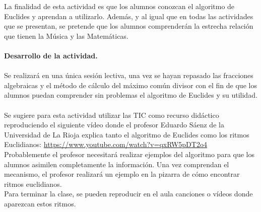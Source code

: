 \documentclass[a4paper, openright, 11pt, titlepage]{report}
\theoremstyle{definition}\newtheorem{defin}[propo]{Definition}
\theoremstyle{definition}\newtheorem{obser}[propo]{Remark}
\theoremstyle{definition}\newtheorem{ejem}[propo]{Ejemplo}
\theoremstyle{definition}\newtheorem{algoritmo}[propo]{Algoritmo}
\begin{document}
\begin{itemize}
    La finalidad de esta actividad es que los alumnos conozcan el algoritmo de Euclides y aprendan a utilizarlo. Además, y al igual que en todas las actividades que se presentan, se pretende que los alumnos comprenderán la estrecha relación que tienen la Música y las Matemáticas.\\\\
    \textbf{Desarrollo de la actividad.}\\\\
    Se realizará en una única sesión lectiva, una vez se hayan repasado las fracciones algebraicas y el método de cálculo del máximo común divisor con el fin de que los alumnos puedan comprender sin problemas el algoritmo de Euclides y su utilidad.\\\\
    Se sugiere para esta actividad utilizar las TIC como recurso didáctico reproduciendo el siguiente vídeo donde el profesor Eduardo Sáenz de la Universidad de La Rioja explica tanto el algoritmo de Euclides como los ritmos Euclidianos: \url{https://www.youtube.com/watch?v=qxRW5pDT2o4}\\
    Probablemente el profesor necesitará realizar ejemplos del algoritmo para que los alumnos asimilen completamente la información. Una vez comprendan el mecanismo, el profesor realizará un ejemplo en la pizarra de cómo encontrar ritmos euclidianos.\\
    Para terminar la clase, se pueden reproducir en el aula canciones o vídeos donde aparezcan estos ritmos. 
\end{itemize}
\end{document}

